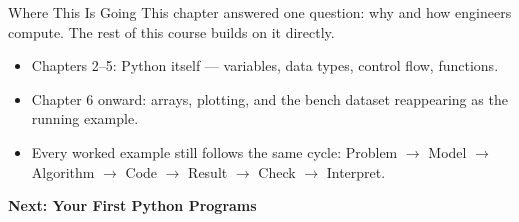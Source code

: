 \documentclass[9pt,aspectratio=169,xcolor=table]{beamer}
\begin{document}
\begin{frame}{Where This Is Going}
    \leavevmode
    \small
    This chapter answered one question: \alert{why} and \alert{how}
    engineers compute. The rest of this course builds on it directly.

    \vspace{3mm}
    \begin{itemize}
        \item Chapters 2--5: Python itself --- variables, data types,
              control flow, functions.
        \item Chapter 6 onward: arrays, plotting, and the bench dataset
              reappearing as the running example.
        \item Every worked example still follows the same cycle:
              \alert{Problem $\to$ Model $\to$ Algorithm $\to$ Code
              $\to$ Result $\to$ Check $\to$ Interpret}.
    \end{itemize}

    \vspace{4mm}
    \begin{center}
        \large\color{primary}\textbf{Next: Your First Python Programs}
    \end{center}
\end{frame}
\end{document}
